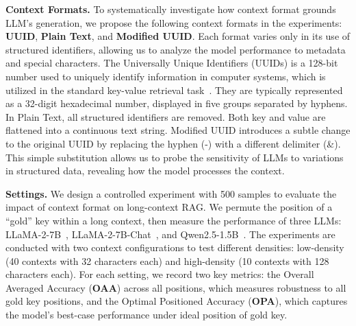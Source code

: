 \documentclass{article} %
\newcommand{\llama}{LLaMA-2-7B}
\newcommand{\llamachat}{LLaMA-2-7B-Chat}
\newcommand{\qwen}{Qwen2.5-1.5B}
\begin{document}
\textbf{Context Formats.}
To systematically investigate how context format grounds LLM's generation, 
we propose the following context formats in the experiments: \textbf{UUID}, \textbf{Plain Text}, and \textbf{Modified UUID}.
Each format varies only in its use of structured identifiers, allowing us to analyze the model performance to metadata and special characters.
The Universally Unique Identifiers (UUIDs) is a 128-bit number used to uniquely identify information in computer systems, which is utilized in the standard key-value retrieval task~\citep{DBLP:journals/tacl/LiuLHPBPL24}. They are typically represented as a 32-digit hexadecimal number, displayed in five groups separated by hyphens.
In Plain Text, all structured identifiers are removed. Both key and value are flattened into a continuous text string.
Modified UUID introduces a subtle change to the original UUID by replacing the hyphen (-) with a different delimiter (\&). This simple substitution allows us to probe the sensitivity of LLMs to variations in structured data, revealing how the model processes the context.


\textbf{Settings.}
We design a controlled experiment with 500 samples to evaluate the impact of context format on long-context RAG. We permute the position of a ``gold'' key within a long context, then measure the performance of three LLMs: \llama{}~\citep{llama}, \llamachat{}~\citep{llama}, and \qwen{}~\citep{qwen2.5}. The experiments are conducted with two context configurations to test different densities: low-density (40 contexts with 32 characters each) and high-density (10 contexts with 128 characters each). For each setting, we record two key metrics: the Overall Averaged Accuracy (\textbf{OAA}) across all positions, which measures robustness to all gold key positions, and the Optimal Positioned Accuracy (\textbf{OPA}), which captures the model's best-case performance under ideal position of gold key.
\end{document}
